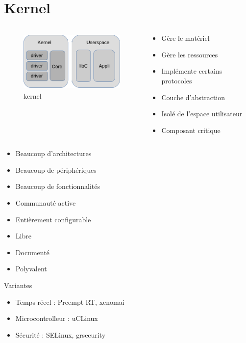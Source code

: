 \section{Kernel}
\begin{frame}
	\begin{columns}
	\begin{column}{0.40\linewidth}
		\begin{figure}
			\includegraphics[height=3cm]{img/arch_linux_full.png}
			 \caption{kernel}
		\end{figure}
	\end{column}
	\begin{column}{0.45\linewidth}
		\begin{itemize}
			\item Gère le matériel
			\item Gère les ressources
			\item Implémente certains protocoles
			\item Couche d'abstraction
			\item Isolé de l'espace utilisateur
			\item Composant critique
		\end{itemize}
	\end{column}
	\end{columns}
\end{frame}
\begin{frame}
	\begin{itemize}
		\item Beaucoup d'architectures
		\item Beaucoup de périphériques
		\item Beaucoup de fonctionnalités
		\item Communauté active
		\item Entièrement configurable
		\item Libre
		\item Documenté
		\item Polyvalent
	\end{itemize}
	\begin{block}{Variantes}
		\begin{itemize}
			\item Temps réeel : Preempt-RT, xenomai
			\item Microcontrolleur : uCLinux
			\item Sécurité : SELinux, grsecurity
		\end{itemize}
	\end{block}
\end{frame}

